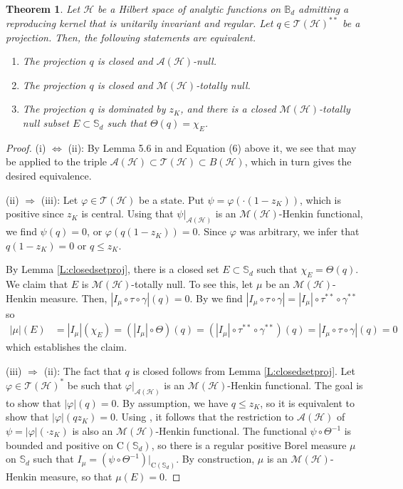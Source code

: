 \documentclass[10pt]{amsart}
\newcommand{\bB}{{\mathbb{B}}}
\newcommand{\bS}{{\mathbb{S}}}
\newcommand{\A}{{\mathcal{A}}}
\renewcommand{\H}{{\mathcal{H}}}
\newcommand{\M}{{\mathcal{M}}}
\newcommand{\T}{{\mathcal{T}}}
\newcommand{\rC}{\mathrm{C}}
\renewcommand{\phi}{\varphi}
\newtheorem{theorem}[lemma]{Theorem}
\theoremstyle{definition}
\begin{document}
\begin{theorem}\label{T:nullAH} Let $\H$ be a Hilbert space of analytic functions on $\bB_d$ admitting  a reproducing kernel that is unitarily invariant and regular. 
Let $q\in \T(\H)^{**}$ be a projection. Then, the following statements are equivalent.
\begin{enumerate}[{\rm (i)}]
\item The projection $q$ is closed and  $\A(\H)$-null.
\item The projection $q$ is closed and $\M(\H)$-totally null.
\item The projection $q$ is dominated by $z_K$, and there is a closed $\M(\H)$-totally null subset $E\subset \bS_d$ such that $\Theta(q)=\chi_E$.\
\end{enumerate}
\end{theorem}
\begin{proof}
(i) $\Leftrightarrow$ (ii): By
Lemma 5.6 in  \cite{CT2023Henkin} and Equation (6) above it, we see that \cite[Theorem 6.2]{CT2023Henkin} may be applied to the triple $\A(\H)\subset \T(\H)\subset B(\H)$, which in turn gives the desired equivalence.


(ii) $\Rightarrow$ (iii): Let $\phi\in \T(\H)$ be a state. Put $\psi=\phi(\cdot (1-z_K))$, which is positive since $z_K$ is central. Using that $\psi|_{\A(\H)}$ is an $\M(\H)$-Henkin functional, we find $\psi(q)=0$, or $\phi(q(1-z_K))=0$. Since $\phi$ was arbitrary, we infer that $q(1-z_K)=0$ or $q\leq z_K$. 

By Lemma \ref{L:closedsetproj}, there is a closed set $E\subset\bS_d$ such that $\chi_E=\Theta(q)$. We claim that $E$ is $\M(\H)$-totally null. To see this, let $\mu$ be an $\M(\H)$-Henkin measure.  Then, $|I_\mu\circ \tau\circ \gamma|(q)=0$.  By \cite[Lemma 2.3]{CT2023Henkin} we find $|I_\mu\circ \tau\circ \gamma|=|I_\mu| \circ \tau^{**}\circ \gamma^{**}$ so
\begin{align*}
|\mu|(E)&=|I_\mu|(\chi_E)=(|I_\mu| \circ \Theta)(q)=(|I_\mu| \circ \tau^{**}\circ \gamma^{**})(q)=|I_\mu\circ \tau\circ \gamma|(q)=0
\end{align*}
which establishes the claim.


(iii) $\Rightarrow$ (ii): The fact that $q$ is closed follows from Lemma \ref{L:closedsetproj}. Let $\phi\in \T(\H)^*$ be such that $\phi|_{\A(\H)}$ is an $\M(\H)$-Henkin functional. The goal is to show that $|\phi|(q)=0$. By assumption, we have $q\leq z_K$, so it is equivalent to show that $|\phi|(qz_K)=0$. Using \cite[Theorem 5.7]{CT2023Henkin}, it follows that the restriction to $\A(\H)$ of $\psi=|\phi|(\cdot z_K)$ is also an $\M(\H)$-Henkin functional. The functional $\psi \circ \Theta^{-1}$ is bounded and positive on $\rC(\bS_d)$, so there  is a regular positive Borel measure $\mu$ on $\bS_d$ such that $I_\mu=(\psi\circ \Theta^{-1})|_{\rC(\bS_d)}$. By construction, $\mu$ is an $\M(\H)$-Henkin measure, so that $\mu(E)=0$.


\end{proof}
\end{document}
